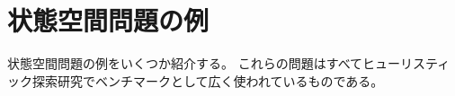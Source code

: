 \documentclass[10pt]{book}
\begin{document}

\section{状態空間問題の例}
\label{sec:search-problem}

状態空間問題の例をいくつか紹介する。
これらの問題はすべてヒューリスティック探索研究でベンチマークとして広く使われているものである。
\end{document}
